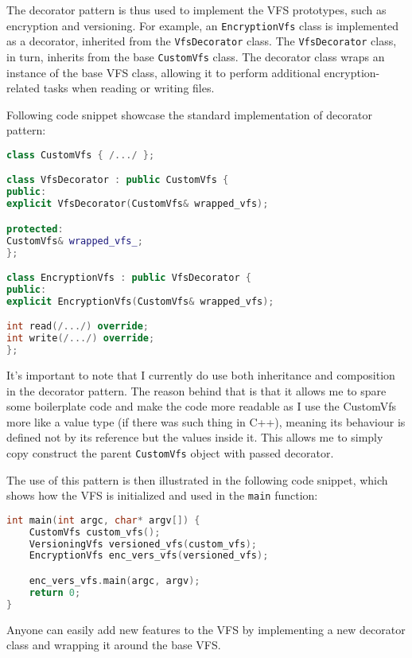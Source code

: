The decorator pattern is thus used to implement the VFS prototypes, such as encryption and versioning.
For example, an \texttt{EncryptionVfs} class is implemented as a decorator, inherited from the \texttt{VfsDecorator} class.
The \texttt{VfsDecorator} class, in turn, inherits from the base \texttt{CustomVfs} class.
The decorator class wraps an instance of the base VFS class, allowing it to perform additional encryption-related tasks when reading or writing files.

Following code snippet showcase the standard implementation of decorator pattern:

\begin{lstlisting}[language=c++, caption={Decorator pattern implementation},basicstyle=\ttfamily\small]
class CustomVfs { /.../ };

class VfsDecorator : public CustomVfs {
public:
explicit VfsDecorator(CustomVfs& wrapped_vfs);

protected:
CustomVfs& wrapped_vfs_;
};

class EncryptionVfs : public VfsDecorator {
public:
explicit EncryptionVfs(CustomVfs& wrapped_vfs);

int read(/.../) override;
int write(/.../) override;
};
\end{lstlisting}

It's important to note that I currently do use both inheritance and composition in the decorator pattern.
The reason behind that is that it allows me to spare some boilerplate code and make the code more readable as I use the CustomVfs more like a value type (if there was such thing in C++), meaning its behaviour is defined not by its reference but the values inside it.
This allows me to simply copy construct the parent \texttt{CustomVfs} object with passed decorator.

The use of this pattern is then illustrated in the following code snippet, which shows how the VFS is initialized and used in the \texttt{main} function:

\begin{lstlisting}[language=c++, caption={VFS initialization and usage},basicstyle=\ttfamily\small]
int main(int argc, char* argv[]) {
    CustomVfs custom_vfs();
    VersioningVfs versioned_vfs(custom_vfs);
    EncryptionVfs enc_vers_vfs(versioned_vfs);

    enc_vers_vfs.main(argc, argv);
    return 0;
}
\end{lstlisting}

Anyone can easily add new features to the VFS by implementing a new decorator class and wrapping it around the base VFS.

